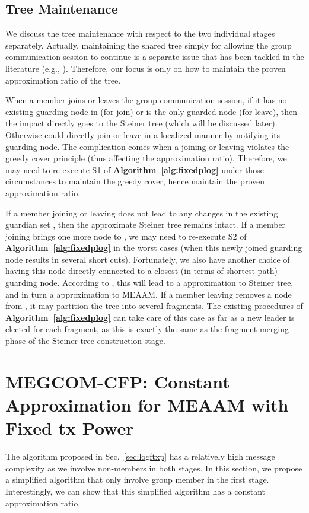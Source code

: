 \documentclass[10pt, conference, compsocconf]{IEEEtran}
\begin{document}
  \subsection{Tree Maintenance}
We discuss the tree maintenance with respect to the two individual stages separately. Actually, maintaining the shared tree simply for allowing the group communication session to continue is a separate issue that has been tackled in the literature (e.g., \cite{Chiang1998,Ji1998,Jia98}). Therefore, our focus is only on how to maintain the proven approximation ratio of the tree.

    When a member  joins or leaves the group communication session, if it has no existing guarding node in  (for join) or is the only guarded node (for leave), then the impact directly goes to the Steiner tree (which will be discussed later). Otherwise  could directly join or leave in a localized manner by notifying its guarding node. The complication comes when a joining or leaving violates the greedy cover principle (thus affecting the approximation ratio). Therefore, we may need to re-execute S1 of \textbf{Algorithm~\ref{alg:fixedplog}} under those circumstances to maintain the greedy cover, hence maintain the proven approximation ratio.

    If a member joining or leaving does not lead to any changes in the existing guardian set , then the approximate Steiner tree remains intact. If a member joining brings one more node to , we may need to re-execute S2 of \textbf{Algorithm~\ref{alg:fixedplog}} in the worst cases (when this newly joined guarding node results in several short cuts). Fortunately, we also have another choice of having this node directly connected to a closest (in terms of shortest path) guarding node. According to \cite{ImaseW91}, this will lead to a  approximation to Steiner tree, and in turn a  approximation to MEAAM. If a member leaving removes a node from , it may partition the tree into several fragments. The existing procedures of \textbf{Algorithm~\ref{alg:fixedplog}} can take care of this case as far as a new leader is elected for each fragment, as this is exactly the same as the fragment merging phase of the Steiner tree construction stage.

\section{MEGCOM-CFP: Constant Approximation for MEAAM with Fixed tx Power} \label{sec:conftxp}
The algorithm proposed in Sec.~\ref{sec:logftxp} has a relatively high message complexity as we involve non-members in both stages. In this section, we propose a simplified algorithm that only involve group member in the first stage. Interestingly, we can show that this simplified algorithm has a constant approximation ratio.
\end{document}
